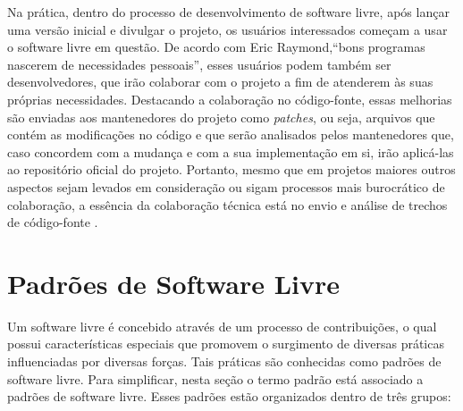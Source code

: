 Na prática, dentro do processo de desenvolvimento de software livre, após lançar
uma versão inicial e divulgar o projeto, os usuários interessados começam a
usar o software livre em questão. 
%
De acordo com Eric Raymond,``bons programas nascerem de
necessidades pessoais'', esses usuários podem também ser desenvolvedores, que
irão colaborar com o projeto a fim de atenderem às suas próprias necessidades.
%
Destacando a colaboração no código-fonte, essas melhorias são enviadas aos
mantenedores do projeto como \emph{patches}, ou seja, arquivos que
contém as modificações no código e que serão analisados pelos mantenedores que,
caso concordem com a mudança e com a sua implementação em si, irão
aplicá-las ao repositório oficial do projeto.
%
Portanto, mesmo que em projetos maiores outros aspectos sejam levados em consideração ou
sigam processos mais burocrático de colaboração, a essência da colaboração
técnica está no envio e análise de trechos de código-fonte \cite{meirelles2013metrics}.


\section{Padrões de Software Livre}
\label{sec-padroes-sl} 

Um software livre é concebido através de um processo de contribuições, o qual possui características especiais que promovem o surgimento de diversas práticas influenciadas por diversas forças. Tais práticas são conhecidas como padrões de software livre. Para simplificar, nesta seção o termo padrão está associado a padrões de software livre. Esses padrões estão organizados dentro de três grupos:

